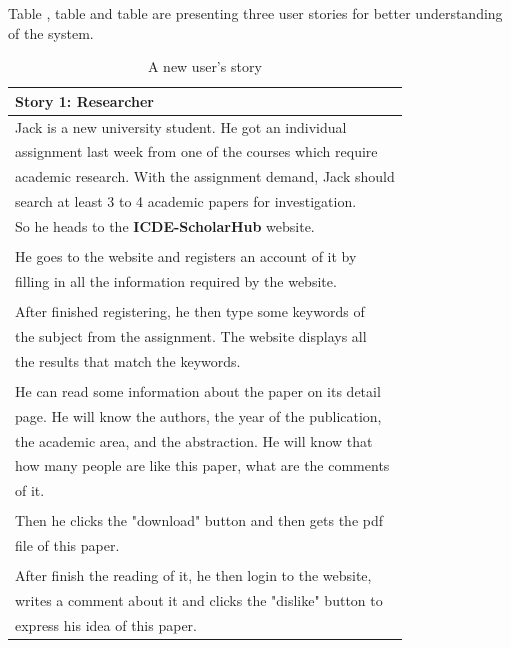 \documentclass[sigconf, nonacm]{../tex_template/acmart}
\begin{document}
Table , table  and table  are presenting three user stories for better understanding of the system.

\begin{table}[h!]
	\begin{tabular}{ l }
		\hline
		\textbf{Story 1: Researcher}                                  \\
		\hline
		Jack is a new university student. He got an individual        \\
		assignment last week from one of the courses which require    \\
		academic research. With the assignment demand, Jack should    \\
		search at least 3 to 4 academic papers for investigation.     \\
		So he heads to the \textbf{ICDE-ScholarHub} website.          \\
		\\
		He goes to the website and registers an account of it by      \\
		filling in all the information required by the website.       \\
		\\
		After finished registering, he then type some keywords of     \\
		the subject from the assignment. The website displays all     \\
		the results that match the keywords.                          \\
		\\
		He can read some information about the paper on its detail    \\
		page. He will know the authors, the year of the publication,  \\
		the academic area, and the abstraction. He will know that     \\
		how many people are like this paper, what are the comments    \\
		of it.                                                        \\
		\\
		Then he clicks the "download" button and then gets the pdf    \\
		file of this paper.                                           \\
		\\
		After finish the reading of it, he then login to the website, \\
		writes a comment about it and clicks the "dislike" button to  \\
		express his idea of this paper.                               \\
		\hline
	\end{tabular}
	\caption{A new user's story}
	\label{table:1}
\end{table}
\end{document}
